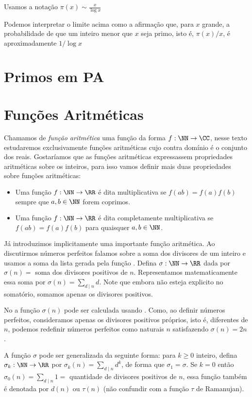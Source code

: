 Usamos a notação $\pi(x) \sim \frac{x}{\log x}$

Podemos interpretar o limite acima como a afirmação
que, para $x$ grande, a probabilidade de que um
inteiro menor que $x$ seja primo, isto é, $\pi(x)/x$,
é aproximadamente $1/\log{x}$

\section{Primos em PA}


\section{Funções Aritméticas}
\label{sec:funarit}
 
Chamamos de \emph{função aritmética} uma função da forma
$f:\NN \to \CC$, nesse texto estudaremos
exclusivamente funções aritméticas cujo contra domínio
é o conjunto dos reais. Gostaríamos que as funções aritméticas 
expressassem propriedades aritméticas sobre os inteiros, para
isso vamos definir mais duas propriedades sobre funções aritméticas:

\begin{itemize}
  \item  Uma função $f:\NN \to \RR$ é dita multiplicativa se
  $f(ab) = f(a)f(b)$ sempre que $a,b \in \NN$ forem coprimos.
  \item  Uma função $f:\NN \to \RR$ é dita completamente
  multiplicativa se $f(ab) = f(a)f(b)$ para quaisquer $a,b \in \NN$.
\end{itemize}

Já introduzimos implicitamente uma importante função
aritmética. Ao discutirmos números perfeitos falamos
sobre a soma dos divisores de um inteiro e usamos a soma
da lista gerada pela 
função . Defina 
$\sigma:\NN \to \RR$ dada por $\sigma(n) =$ soma
dos divisores positivos de $n$. Representamos
matematicamente essa soma por $\sigma(n) = \sum_{d\mid n} d$. Note que
embora não esteja explicito no somatório, somamos apenas os
divisores positivos.

No \sage a função 
$\sigma(n)$ pode ser calculada usando
. Como, ao definir números perfeitos,
consideramos apenas os divisores positivos próprios,
isto é, diferentes de $n$, podemos redefinir números
perfeitos como naturais $n$ satisfazendo $\sigma(n) = 2n$.

A função $\sigma$ pode ser generalizada da seguinte forma:
para $k\geq 0$ inteiro, defina $\sigma_k:\NN \to \RR$
por $\sigma_k(n) = \sum_{d\mid n} d^k$, de forma
que $\sigma_1 = \sigma$. 
Se $k=0$ então
$\sigma_0(n) = \sum_{d \mid n} 1 = $ quantidade de divisores
positivos de $n$, essa função também é denotada por $d(n)$ ou
$\tau(n)$ (não confundir com a função $\tau$ de Ramanujan).

